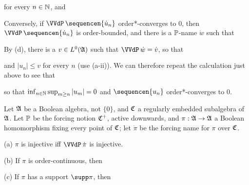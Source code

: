 {

\noindent for every $n\in\Bbb N$, and


Conversely, if $\VVdP\,\sequencen{\dot u_n}$ order*-converges to
$0$, then $\VVdP\,\sequencen{\dot u_n}$ is order-bounded, and there is a
$\Bbb P$-name $\dot w$ such that


\noindent By (d), there is a $v\in L^0(\frak A)$ such that
$\VVdP\,\dot w=\dot v$, so that


\noindent and $|u_n|\le v$ for every $n$ (use (a-ii)).
We can therefore repeat the calculation just above to see that


\noindent so that $\inf_{n\in\Bbb N}\sup_{m\ge n}|u_m|=0$ and
$\sequencen{u_n}$ order*-converges to $0$.
}%

 Let $\frak A$ be a Boolean algebra,
not $\{0\}$, and $\frak C$ a regularly embedded
subalgebra of $\frak A$.   Let $\Bbb P$ be the forcing notion
$\frak C^+$, active downwards, and
$\pi:\frak A\to\frak A$ a Boolean homomorphism fixing every point of
$\frak C$;  let $\dot\pi$ be the forcing name for $\pi$ over $\frak C$.

(a) $\pi$ is injective iff $\VVdP\,\dot\pi$ is injective.

(b) If $\pi$ is order-continuous, then


(c) If $\pi$ has a support $\supp\pi$, then


